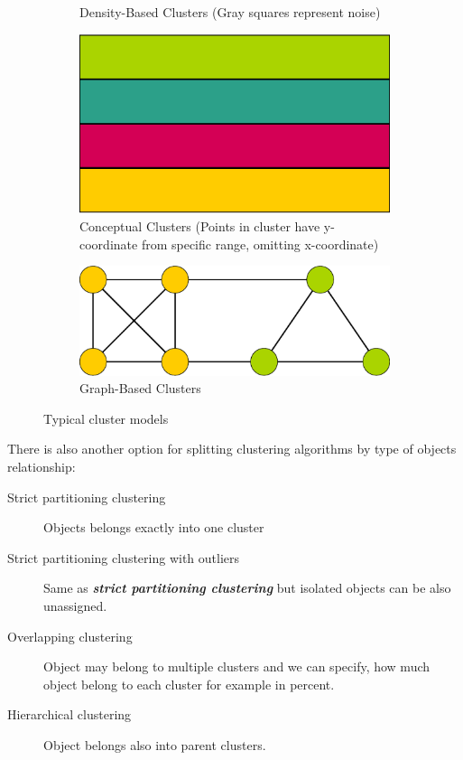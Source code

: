 \begin{figure}[h]
\begin{subfigure}{.49\textwidth}
  \caption{Density-Based Clusters (Gray squares represent noise)}
  \label{fig:densityClusters}
\end{subfigure}
\vspace*{0.5cm} 
\begin{subfigure}{.49\textwidth}
  \centering
  \includegraphics[width=.5\linewidth]{img/conceptualClusters.eps}
  \caption{Conceptual Clusters (Points in cluster have y-coordinate from specific range, omitting x-coordinate)}
  \label{fig:conceptualClusters}
\end{subfigure}
\begin{subfigure}{.49\textwidth}
  \centering
  \includegraphics[width=.5\linewidth]{img/graphClusters.eps}
  \caption{Graph-Based Clusters}
  \label{fig:graphClusters}
\end{subfigure}
\caption{Typical cluster models}
\end{figure}

\vspace{8 mm}
\noindent
There is also another option for splitting clustering algorithms by type of objects relationship: 

\begin{description}
\item[Strict partitioning clustering] Objects belongs exactly into one cluster
\item[Strict partitioning clustering with outliers] Same as \textit{\textbf{strict partitioning clustering}} but isolated objects can be also unassigned. 
\item[Overlapping clustering] Object may belong to multiple clusters and we can specify, how much object belong to each cluster for example in percent.
\item[Hierarchical clustering] Object belongs also into parent clusters.
\end{description}
 \pagebreak
